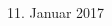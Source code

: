 \begin{titlepage}
\begin{addmargin}[1.5cm]{0cm}
\begin{center}
{  \vspace{1.0cm}
  \large{11. Januar 2017}%
}
\end{center}
\end{addmargin}
\end{titlepage}
